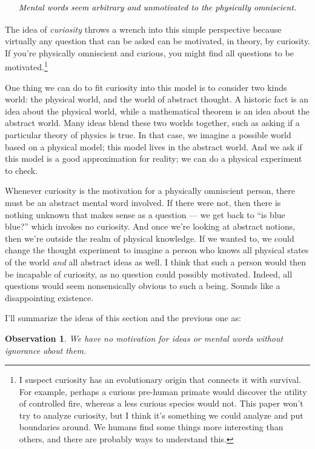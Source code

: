 \documentclass[11pt, oneside]{article}   	%
\newtheorem{obs}{Observation}
\begin{document}
\begin{equation}\label{eq3}
    \text{\em Mental words seem arbitrary and unmotivated to the physically
    omniscient.}
\end{equation}

The idea of {\em curiosity} throws a wrench into this simple perspective because
virtually any question that can be asked can be motivated, in theory, by
curiosity. If you're physically omniscient and curious, you might find all
questions to be motivated.\footnote{I suspect curiosity has an evolutionary
origin that connects it with survival. For example, perhaps a curious pre-human
primate would discover the utility of controlled fire, whereas a less curious
species would not. This paper won't try to analyze curiosity, but I think it's
something we could analyze and put boundaries around. We humans find some things
more interesting than others, and there are probably ways to understand this.}

One thing we can do to fit curiosity into this model is to consider two kinds
world: the physical world, and the world of abstract thought.
A historic fact is an idea about the physical world, while a mathematical
theorem is an idea about the abstract world.
Many ideas blend these two worlds together, such as asking if a particular
theory of physics is true. In that case, we imagine a possible world based on a
physical model; this model lives in the abstract world. And we ask if this model
is a good approximation for reality; we can do a physical experiment to check.

Whenever curiosity is the motivation for a physically omniscient person, there
must be an abstract mental word involved. If there were not, then there is
nothing unknown that makes sense as a question --- we get back to
``is blue blue?'' which invokes no curiosity. And once we're looking at abstract
notions, then we're outside the realm of physical knowledge.
If we wanted to, we could change the thought experiment to imagine a person who
knows all physical states of the world {\em and} all abstract ideas as well. I
think that such a person would then be incapable of curiosity, as no question
could possibly motivated. Indeed, all questions would seem nonsensically obvious
to such a being. Sounds like a disappointing existence.

I'll summarize the ideas of this section and the previous one as:
\begin{obs}\label{o5}
    We have no motivation for ideas or mental words without ignorance about
    them.
\end{obs}
\end{document}
